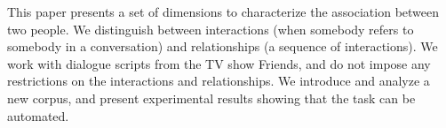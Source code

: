 This paper presents a set of dimensions to characterize the association between two people. We distinguish between interactions (when somebody refers to somebody in a conversation) and relationships (a sequence of interactions). We work with dialogue scripts from the TV show Friends, and do not impose any restrictions on the interactions and relationships. We introduce and analyze a new corpus, and present experimental results showing that the task can be automated.
